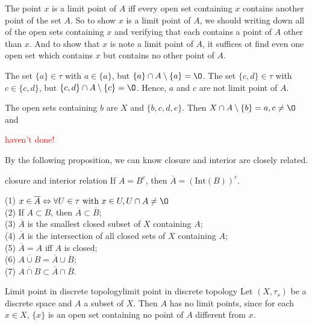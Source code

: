 The point $x$ is a limit point of $A$ iff every open set containing $x$ contains another point of the set $A$. 
So to show $x$ is a limit point of $A$, 
we should writing down all of the open sets containing $x$ and verifying that each contains a point of $A$ other than $x$.
And to show that $x$ is note a limit point of $A$, 
it suffices ot find even one open set which contains $x$ but contains no other point of $A$. 

\par
The set $\{a\}\in \tau$ with $a\in \{a\}$, but $\{a\}\cap A\setminus\{a\}=\O$. 
The set $\{c,d\}\in \tau$ with $c\in \{c,d\}$, but $\{c,d\}\cap A\setminus\{c\}=\O$.
Hence, $a$ and $c$ are not limit point of $A$.

The open sets containing $b$ are $X$ and $\{b,c,d,e\}$. Then $X\cap A\setminus \{b\} = {a,c}\neq \O$ and 
\par
\textcolor{red}{haven't done!}

By the following proposition, we can know closure and interior are closely related.

\begin{proposition}{}{closure and interior relation}
   If $A=B^c$, then $\overline{A} = (\text{Int}(B))^c$.
\end{proposition}

\begin{proposition}{}{}
    (1) $x\in \overline{A} \Leftrightarrow \forall U\in \tau \text{ with } x\in U, U\cap A\neq \O$\\
    (2) If $A\subset B$, then $\overline{A}\subset \overline{B}$;\\
    (3) $\overline{A}$ is the smallest closed subset of $X$ containing $A$;\\
    (4) $\overline{A}$ is the intersection of all closed sets of $X$ containing $A$;\\
    (5) $\overline{A}=A$ iff $A$ is closed;\\
    (6) $\overline{A\cup B}=\overline{A}\cup\overline{B}$;\\
    (7) $\overline{A\cap B}\subset \overline{A}\cap \overline{B}$.
\end{proposition}


\begin{example}{Limit point in discrete topology}{limit point in discrete topology}
    Let $(X,\tau_s)$ be a discrete space and $A$ a subset of $X$. 
    Then $A$ has no limit points, since for each $x\in X$, 
    $\{x\}$ is an open set containing no point of $A$ different from $x$.
\end{example}

